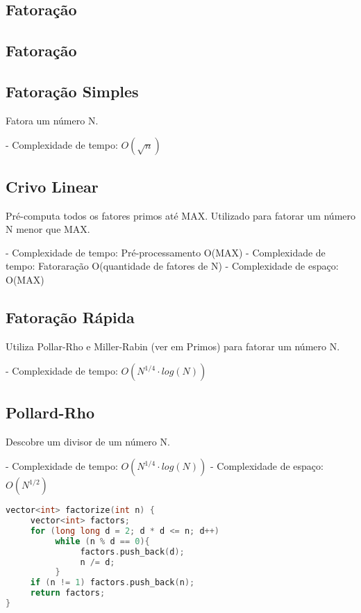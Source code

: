 \documentclass[11pt, a4paper, twoside]{article}
\begin{document}
\subsection{Fatoração}

\subsection{Fatoração}



\subsection{Fatoração Simples}

Fatora um número N.

- Complexidade de tempo: $O(\sqrt n )$

\subsection{Crivo Linear}

Pré-computa todos os fatores primos até MAX.
Utilizado para fatorar um número N menor que MAX.

- Complexidade de tempo: Pré-processamento O(MAX)
- Complexidade de tempo: Fatoraração O(quantidade de fatores de N)
- Complexidade de espaço: O(MAX)

\subsection{Fatoração Rápida}

Utiliza Pollar-Rho e Miller-Rabin (ver em Primos) para fatorar um número N.

- Complexidade de tempo: $O(N^{1/4} \cdot log(N))$

\subsection{Pollard-Rho}

Descobre um divisor de um número N.

- Complexidade de tempo: $O(N^{1/4} \cdot log(N))$
- Complexidade de espaço: $O(N^{1/2})$

\begin{multicols}{2}
\begin{lstlisting}[language=C++]
vector<int> factorize(int n) {
     vector<int> factors;    
     for (long long d = 2; d * d <= n; d++)
          while (n % d == 0){
               factors.push_back(d);
               n /= d;
          }
     if (n != 1) factors.push_back(n);
     return factors;
}
\end{lstlisting}
\end{multicols}
\end{document}
